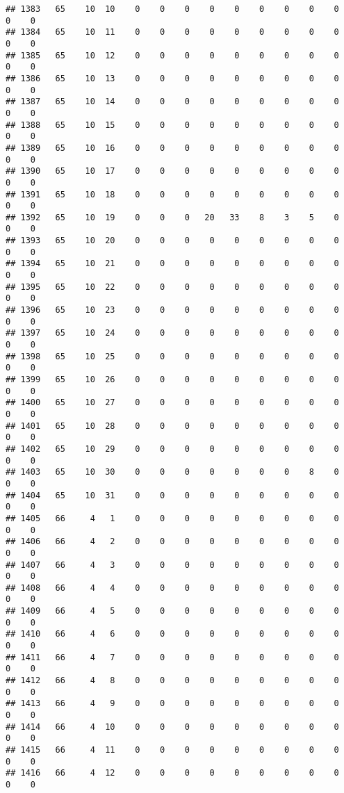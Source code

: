 \documentclass[]{article}
\begin{document}
\begin{verbatim}
## 1383   65    10  10    0    0    0    0    0    0    0    0    0    0    0
## 1384   65    10  11    0    0    0    0    0    0    0    0    0    0    0
## 1385   65    10  12    0    0    0    0    0    0    0    0    0    0    0
## 1386   65    10  13    0    0    0    0    0    0    0    0    0    0    0
## 1387   65    10  14    0    0    0    0    0    0    0    0    0    0    0
## 1388   65    10  15    0    0    0    0    0    0    0    0    0    0    0
## 1389   65    10  16    0    0    0    0    0    0    0    0    0    0    0
## 1390   65    10  17    0    0    0    0    0    0    0    0    0    0    0
## 1391   65    10  18    0    0    0    0    0    0    0    0    0    0    0
## 1392   65    10  19    0    0    0   20   33    8    3    5    0    0    0
## 1393   65    10  20    0    0    0    0    0    0    0    0    0    0    0
## 1394   65    10  21    0    0    0    0    0    0    0    0    0    0    0
## 1395   65    10  22    0    0    0    0    0    0    0    0    0    0    0
## 1396   65    10  23    0    0    0    0    0    0    0    0    0    0    0
## 1397   65    10  24    0    0    0    0    0    0    0    0    0    0    0
## 1398   65    10  25    0    0    0    0    0    0    0    0    0    0    0
## 1399   65    10  26    0    0    0    0    0    0    0    0    0    0    0
## 1400   65    10  27    0    0    0    0    0    0    0    0    0    0    0
## 1401   65    10  28    0    0    0    0    0    0    0    0    0    0    0
## 1402   65    10  29    0    0    0    0    0    0    0    0    0    0    0
## 1403   65    10  30    0    0    0    0    0    0    0    8    0    0    0
## 1404   65    10  31    0    0    0    0    0    0    0    0    0    0    0
## 1405   66     4   1    0    0    0    0    0    0    0    0    0    0    0
## 1406   66     4   2    0    0    0    0    0    0    0    0    0    0    0
## 1407   66     4   3    0    0    0    0    0    0    0    0    0    0    0
## 1408   66     4   4    0    0    0    0    0    0    0    0    0    0    0
## 1409   66     4   5    0    0    0    0    0    0    0    0    0    0    0
## 1410   66     4   6    0    0    0    0    0    0    0    0    0    0    0
## 1411   66     4   7    0    0    0    0    0    0    0    0    0    0    0
## 1412   66     4   8    0    0    0    0    0    0    0    0    0    0    0
## 1413   66     4   9    0    0    0    0    0    0    0    0    0    0    0
## 1414   66     4  10    0    0    0    0    0    0    0    0    0    0    0
## 1415   66     4  11    0    0    0    0    0    0    0    0    0    0    0
## 1416   66     4  12    0    0    0    0    0    0    0    0    0    0    0

\end{verbatim}
\end{document}
